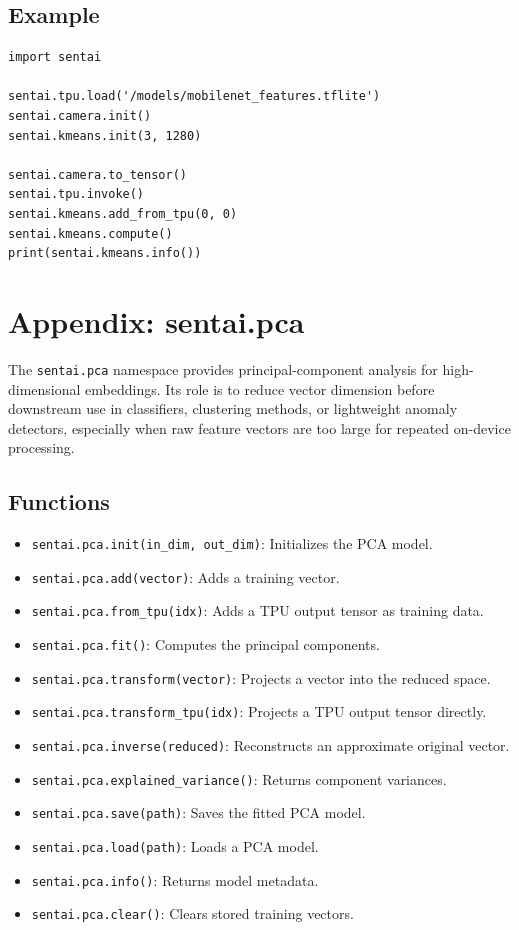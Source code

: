 \subsection{Example}\label{example-16}

\begin{verbatim}
import sentai

sentai.tpu.load('/models/mobilenet_features.tflite')
sentai.camera.init()
sentai.kmeans.init(3, 1280)

sentai.camera.to_tensor()
sentai.tpu.invoke()
sentai.kmeans.add_from_tpu(0, 0)
sentai.kmeans.compute()
print(sentai.kmeans.info())
\end{verbatim}

\section{Appendix: sentai.pca}\label{appendix-sentai.pca}

The \texttt{sentai.pca} namespace provides principal-component analysis
for high-dimensional embeddings. Its role is to reduce vector dimension
before downstream use in classifiers, clustering methods, or lightweight
anomaly detectors, especially when raw feature vectors are too large for
repeated on-device processing.

\subsection{Functions}\label{functions-17}

\begin{itemize}
\tightlist
\item
  \texttt{sentai.pca.init(in\_dim,\ out\_dim)}: Initializes the PCA
  model.
\item
  \texttt{sentai.pca.add(vector)}: Adds a training vector.
\item
  \texttt{sentai.pca.from\_tpu(idx)}: Adds a TPU output tensor as
  training data.
\item
  \texttt{sentai.pca.fit()}: Computes the principal components.
\item
  \texttt{sentai.pca.transform(vector)}: Projects a vector into the
  reduced space.
\item
  \texttt{sentai.pca.transform\_tpu(idx)}: Projects a TPU output tensor
  directly.
\item
  \texttt{sentai.pca.inverse(reduced)}: Reconstructs an approximate
  original vector.
\item
  \texttt{sentai.pca.explained\_variance()}: Returns component
  variances.
\item
  \texttt{sentai.pca.save(path)}: Saves the fitted PCA model.
\item
  \texttt{sentai.pca.load(path)}: Loads a PCA model.
\item
  \texttt{sentai.pca.info()}: Returns model metadata.
\item
  \texttt{sentai.pca.clear()}: Clears stored training vectors.
\end{itemize}

